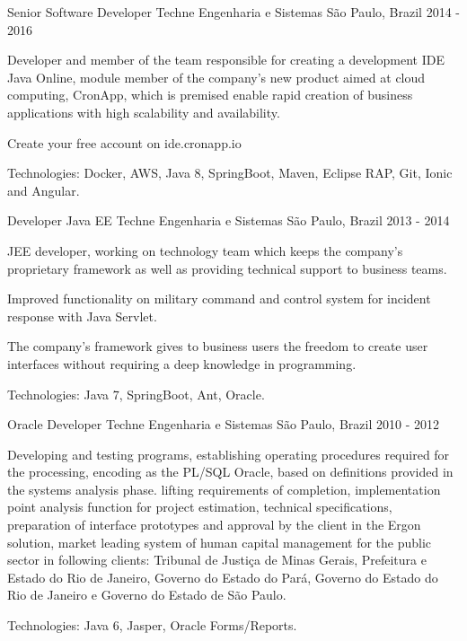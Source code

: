 \begin{cventries}
  \cventry
    {Senior Software Developer} %
    {Techne Engenharia e Sistemas} %
    {São Paulo, Brazil} %
    {2014 - 2016} %
    {
      \begin{cvitems} %
        \item {Developer and member of the team responsible for creating a development IDE Java Online, module member of the company's new product aimed at cloud computing, CronApp, which is premised enable rapid creation of business applications with high scalability and availability.}
        \item {Create your free account on ide.cronapp.io}
        \item {Technologies: Docker, AWS, Java 8, SpringBoot, Maven, Eclipse RAP, Git, Ionic and Angular.}
      \end{cvitems}
    }

  \cventry
    {Developer Java EE} %
    {Techne Engenharia e Sistemas} %
    {São Paulo, Brazil} %
    {2013 - 2014} %
    {
      \begin{cvitems} %
        \item {JEE developer, working on technology team which keeps the company's proprietary framework as well as providing technical support to business teams.}
        \item {Improved functionality on military command and control system for incident response with Java Servlet.}
        \item {The company's framework gives to business users the freedom to create user interfaces without requiring a deep knowledge in programming.}
        \item {Technologies: Java 7, SpringBoot, Ant, Oracle.}
      \end{cvitems}
    }

  \cventry
    {Oracle Developer} %
    {Techne Engenharia e Sistemas} %
	  {São Paulo, Brazil} %
    {2010 - 2012} %
    {
      \begin{cvitems} %
        \item {Developing and testing programs, establishing operating procedures required for the processing, encoding as the PL/SQL Oracle, based on definitions provided in the systems analysis phase.
lifting requirements of completion, implementation point analysis function for project estimation, technical specifications, preparation of interface prototypes and approval by the client in the Ergon solution, market leading system of human capital management for the public sector in following clients: Tribunal de Justiça de Minas Gerais, Prefeitura e Estado do Rio de Janeiro, Governo do Estado do Pará, Governo do Estado do Rio de Janeiro e Governo do Estado de São Paulo.}
        \item {Technologies: Java 6, Jasper, Oracle Forms/Reports.}
      \end{cvitems}
    }


\end{cventries}
